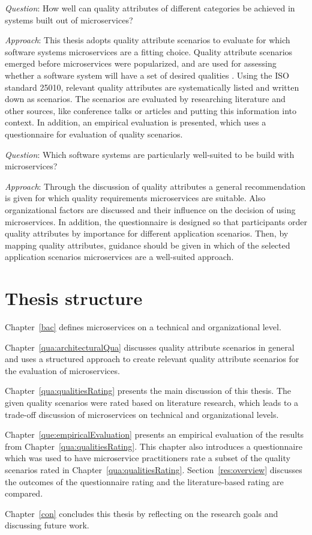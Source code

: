 \textit{Question}: How well can quality attributes of different categories be achieved in systems built out of microservices?

\textit{Approach}:
This thesis adopts quality attribute scenarios to evaluate for which software systems microservices are a fitting choice.
Quality attribute scenarios emerged before microservices were popularized, and are used for assessing whether a software system will have a set of desired qualities \cite{BarbacciQualityAttribute2003}.
Using the ISO standard 25010, relevant quality attributes are systematically listed and written down as scenarios.
The scenarios are evaluated by researching literature and other sources, like conference talks or articles and putting this information into context. 
In addition, an empirical evaluation is presented, which uses a questionnaire for evaluation of quality scenarios.

\textit{Question}: Which software systems are particularly well-suited to be build with microservices?

\textit{Approach}:
Through the discussion of quality attributes a general recommendation is given for which quality requirements microservices are suitable.
Also organizational factors are discussed and their influence on the decision of using microservices.
In addition, the questionnaire is designed so that participants order quality attributes by importance for different application scenarios.
Then, by mapping quality attributes, guidance should be given in which of the selected application scenarios microservices are a well-suited approach.

\section{Thesis structure}

Chapter~\ref{bac} defines microservices on a technical and organizational level.

Chapter~\ref{qua:architecturalQua} discusses quality attribute scenarios in general and uses a structured approach to create relevant quality attribute scenarios for the evaluation of microservices.

Chapter~\ref{qua:qualitiesRating} presents the main discussion of this thesis.
The given quality scenarios were rated based on literature research, which leads to a trade-off discussion of microservices on technical and organizational levels.

Chapter~\ref{que:empiricalEvaluation} presents an empirical evaluation of the results from Chapter~\ref{qua:qualitiesRating}.
This chapter also introduces a questionnaire which was used to have microservice practitioners rate a subset of the quality scenarios rated in Chapter~\ref{qua:qualitiesRating}. 
Section~\ref{res:overview} discusses the outcomes of the questionnaire rating and the literature-based rating are compared.

Chapter~\ref{con} concludes this thesis by reflecting on the research goals and discussing future work.
